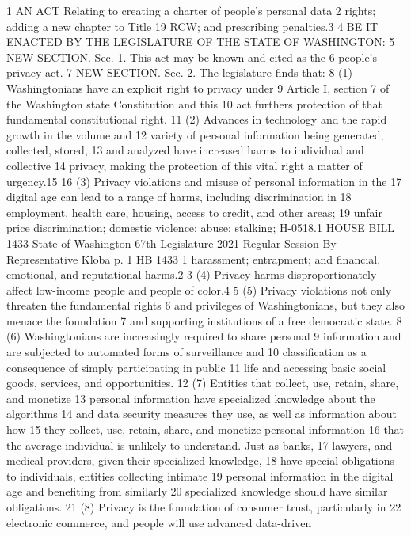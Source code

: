 1 AN ACT Relating to creating a charter of people's personal data
2 rights; adding a new chapter to Title 19 RCW; and prescribing
penalties.3
4 BE IT ENACTED BY THE LEGISLATURE OF THE STATE OF WASHINGTON:
5 NEW SECTION. Sec. 1. This act may be known and cited as the
6 people's privacy act.
7 NEW SECTION. Sec. 2. The legislature finds that:
8 (1) Washingtonians have an explicit right to privacy under
9 Article I, section 7 of the Washington state Constitution and this
10 act furthers protection of that fundamental constitutional right.
11 (2) Advances in technology and the rapid growth in the volume and
12 variety of personal information being generated, collected, stored,
13 and analyzed have increased harms to individual and collective
14 privacy, making the protection of this vital right a matter of
urgency.15
16 (3) Privacy violations and misuse of personal information in the
17 digital age can lead to a range of harms, including discrimination in
18 employment, health care, housing, access to credit, and other areas;
19 unfair price discrimination; domestic violence; abuse; stalking;
H-0518.1
HOUSE BILL 1433
State of Washington 67th Legislature 2021 Regular Session
By Representative Kloba
p. 1 HB 1433
1 harassment; entrapment; and financial, emotional, and reputational
harms.2
3 (4) Privacy harms disproportionately affect low-income people and
people of color.4
5 (5) Privacy violations not only threaten the fundamental rights
6 and privileges of Washingtonians, but they also menace the foundation
7 and supporting institutions of a free democratic state.
8 (6) Washingtonians are increasingly required to share personal
9 information and are subjected to automated forms of surveillance and
10 classification as a consequence of simply participating in public
11 life and accessing basic social goods, services, and opportunities.
12 (7) Entities that collect, use, retain, share, and monetize
13 personal information have specialized knowledge about the algorithms
14 and data security measures they use, as well as information about how
15 they collect, use, retain, share, and monetize personal information
16 that the average individual is unlikely to understand. Just as banks,
17 lawyers, and medical providers, given their specialized knowledge,
18 have special obligations to individuals, entities collecting intimate
19 personal information in the digital age and benefiting from similarly
20 specialized knowledge should have similar obligations.
21 (8) Privacy is the foundation of consumer trust, particularly in
22 electronic commerce, and people will use advanced data-driven
